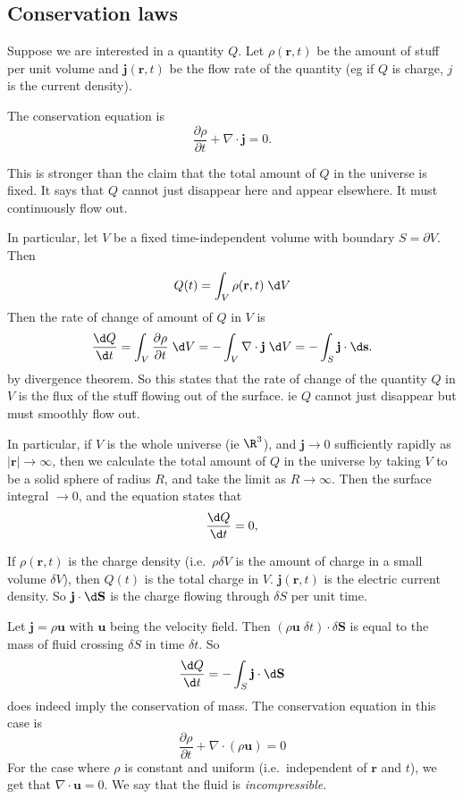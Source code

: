 \documentclass[a4paper]{article}
\begin{document}
\subsection{Conservation laws}
\begin{defi}
  Suppose we are interested in a quantity $Q$. Let $\rho(\mathbf{r}, t)$ be the amount of stuff per unit volume and $\mathbf{j}(\mathbf{r}, t)$ be the flow rate of the quantity (eg if $Q$ is charge, $j$ is the current density).

  The conservation equation is
  \[
    \frac{\partial \rho}{\partial t} + \nabla\cdot \mathbf{j} = 0.
  \]
\end{defi}
This is stronger than the claim that the total amount of $Q$ in the universe is fixed. It says that $Q$ cannot just disappear here and appear elsewhere. It must continuously flow out.

In particular, let $V$ be a fixed time-independent volume with boundary $S = \partial V$. Then
\[
  Q(t) = \int_V \rho (\mathbf{r}, t)\; \d V
\]
Then the rate of change of amount of $Q$ in $V$ is
\[
  \frac{\d Q}{\d t} = \int_V \frac{\partial \rho }{\partial t}\;\d V = -\int_V \nabla \cdot \mathbf{j}\;\d V = -\int_S \mathbf{j}\cdot \d \mathbf{s}.
\]
by divergence theorem. So this states that the rate of change of the quantity $Q$ in $V$ is the flux of the stuff flowing out of the surface. ie $Q$ cannot just disappear but must smoothly flow out.

In particular, if $V$ is the whole universe (ie $\R^3$), and $\mathbf{j}\to 0$ sufficiently rapidly as $|\mathbf{r}| \to \infty$, then we calculate the total amount of $Q$ in the universe by taking $V$ to be a solid sphere of radius $R$, and take the limit as $R\to \infty$. Then the surface integral $\to 0$, and the equation states that
\[
  \frac{\d Q}{\d t} = 0,
\]
\begin{eg}
  If $\rho(\mathbf{r}, t)$ is the charge density (i.e.\ $\rho\delta V$ is the amount of charge in a small volume $\delta V$), then $Q(t)$ is the total charge in $V$. $\mathbf{j}(\mathbf{r}, t)$ is the electric current density. So $\mathbf{j}\cdot \d \mathbf{S}$ is the charge flowing through $\delta S$ per unit time.
\end{eg}

\begin{eg}
  Let $\mathbf{j} = \rho \mathbf{u}$ with $\mathbf{u}$ being the velocity field. Then $(\rho\mathbf{u}\; \delta t)\cdot \delta \mathbf{S}$ is equal to the mass of fluid crossing $\delta S$ in time $\delta t$. So
  \[
    \frac{\d Q}{\d t} = -\int_S \mathbf{j}\cdot \d \mathbf{S}
  \]
  does indeed imply the conservation of mass. The conservation equation in this case is
  \[
    \frac{\partial \rho}{\partial t} + \nabla\cdot (\rho \mathbf{u}) = 0
  \]
  For the case where $\rho$ is constant and uniform (i.e.\ independent of $\mathbf{r}$ and $t$), we get that $\nabla\cdot \mathbf{u} = 0$. We say that the fluid is \emph{incompressible}.
\end{eg}
\end{document}
